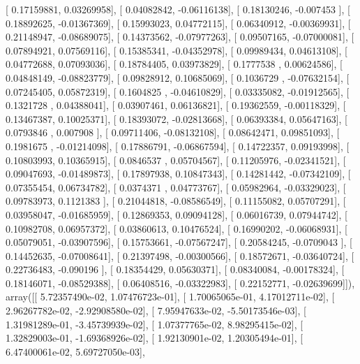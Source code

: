 \documentclass{article}
\begin{document}
       [ 0.17159881,  0.03269958],
       [ 0.04082842, -0.06116138],
       [ 0.18130246, -0.007453  ],
       [ 0.18892625, -0.01367369],
       [ 0.15993023,  0.04772115],
       [ 0.06340912, -0.00369931],
       [ 0.21148947, -0.08689075],
       [ 0.14373562, -0.07977263],
       [ 0.09507165, -0.07000081],
       [ 0.07894921,  0.07569116],
       [ 0.15385341, -0.04352978],
       [ 0.09989434,  0.04613108],
       [ 0.04772688,  0.07093036],
       [ 0.18784405,  0.03973829],
       [ 0.1777538 ,  0.00624586],
       [ 0.04848149, -0.08823779],
       [ 0.09828912,  0.10685069],
       [ 0.1036729 , -0.07632154],
       [ 0.07245405,  0.05872319],
       [ 0.1604825 , -0.04610829],
       [ 0.03335082, -0.01912565],
       [ 0.1321728 ,  0.04388041],
       [ 0.03907461,  0.06136821],
       [ 0.19362559, -0.00118329],
       [ 0.13467387,  0.10025371],
       [ 0.18393072, -0.02813668],
       [ 0.06393384,  0.05647163],
       [ 0.0793846 ,  0.007908  ],
       [ 0.09711406, -0.08132108],
       [ 0.08642471,  0.09851093],
       [ 0.1981675 , -0.01214098],
       [ 0.17886791, -0.06867594],
       [ 0.14722357,  0.09193998],
       [ 0.10803993,  0.10365915],
       [ 0.0846537 ,  0.05704567],
       [ 0.11205976, -0.02341521],
       [ 0.09047693, -0.01489873],
       [ 0.17897938,  0.10847343],
       [ 0.14281442, -0.07342109],
       [ 0.07355454,  0.06734782],
       [ 0.0374371 ,  0.04773767],
       [ 0.05982964, -0.03329023],
       [ 0.09783973,  0.1121383 ],
       [ 0.21044818, -0.08586549],
       [ 0.11155082,  0.05707291],
       [ 0.03958047, -0.01685959],
       [ 0.12869353,  0.09094128],
       [ 0.06016739,  0.07944742],
       [ 0.10982708,  0.06957372],
       [ 0.03860613,  0.10476524],
       [ 0.16990202, -0.06068931],
       [ 0.05079051, -0.03907596],
       [ 0.15753661, -0.07567247],
       [ 0.20584245, -0.0709043 ],
       [ 0.14452635, -0.07008641],
       [ 0.21397498, -0.00300566],
       [ 0.18572671, -0.03640724],
       [ 0.22736483, -0.090196  ],
       [ 0.18354429,  0.05630371],
       [ 0.08340084, -0.00178324],
       [ 0.18146071, -0.08529388],
       [ 0.06408516, -0.03322983],
       [ 0.22152771, -0.02639699]]), array([[  5.72357490e-02,   1.07476723e-01],
       [  1.70065065e-01,   4.17012711e-02],
       [  2.96267782e-02,  -2.92908580e-02],
       [  7.95947633e-02,  -5.50173546e-03],
       [  1.31981289e-01,  -3.45739939e-02],
       [  1.07377765e-02,   8.98295415e-02],
       [  1.32829003e-01,  -1.69368926e-02],
       [  1.92130901e-02,   1.20305494e-01],
       [  6.47400061e-02,   5.69727050e-03],
\end{document}
